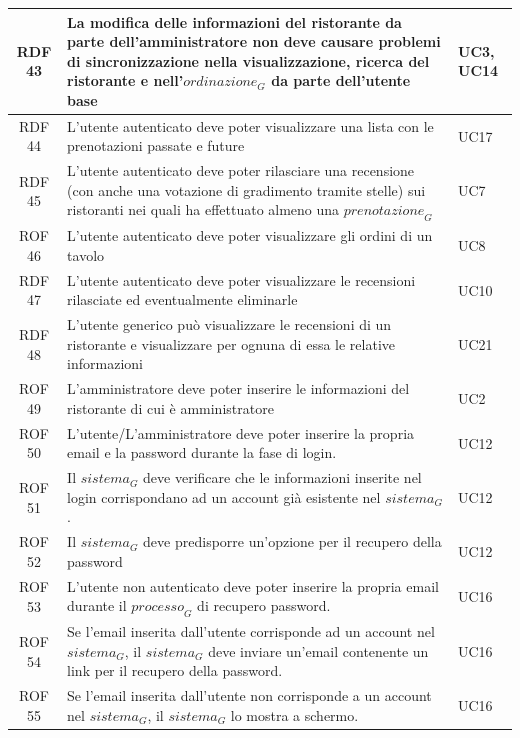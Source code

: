 \documentclass[12pt, oneside]{article}
\begin{document}
\begin{longtable}{|c|p{14cm}|p{2cm}|}
    \hline
    RDF 43& La modifica delle informazioni del ristorante da parte dell'amministratore non deve causare problemi di sincronizzazione nella visualizzazione, ricerca del ristorante e nell'$\textit{ordinazione}_G$ da parte dell'utente base & UC3, UC14 \\
    \hline
    RDF 44& L'utente autenticato deve poter visualizzare una lista con le prenotazioni passate e future & UC17 \\
    \hline
    RDF 45& L'utente autenticato deve poter rilasciare una recensione (con anche una votazione di gradimento tramite stelle) sui ristoranti nei quali ha effettuato almeno una $\textit{prenotazione}_G$ & UC7 \\
    \hline
    ROF 46& L'utente autenticato deve poter visualizzare gli ordini di un tavolo & UC8 \\
    \hline
    RDF 47& L'utente autenticato deve poter visualizzare le recensioni rilasciate ed eventualmente eliminarle & UC10 \\
    \hline
    RDF 48& L'utente generico può visualizzare le recensioni di un ristorante e visualizzare per ognuna di essa le relative informazioni & UC21 \\
    \hline
    ROF 49& L'amministratore deve poter inserire le informazioni del ristorante di cui è amministratore & UC2 \\
    \hline
    ROF 50& L'utente/L'amministratore deve poter inserire la propria email e la password durante la fase di login.  & UC12 \\
    \hline
    ROF 51& Il $\textit{sistema}_G$ deve verificare che le informazioni inserite nel login corrispondano ad un account già esistente nel $\textit{sistema}_G$.  & UC12 \\
    \hline
    ROF 52& Il $\textit{sistema}_G$ deve predisporre un'opzione per il recupero della password  & UC12 \\
    \hline
    ROF 53& L'utente non autenticato deve poter inserire la propria email durante il $\textit{processo}_G$ di recupero password.  & UC16 \\
    \hline
    ROF 54 & Se l'email inserita dall'utente corrisponde ad un account nel $\textit{sistema}_G$, il $\textit{sistema}_G$ deve inviare un'email contenente un link per il recupero della password.  & UC16 \\
    \hline
    ROF 55 & Se l'email inserita dall'utente non corrisponde a un account nel $\textit{sistema}_G$, il $\textit{sistema}_G$ lo mostra a schermo.  & UC16 \\

\end{longtable}
\end{document}
